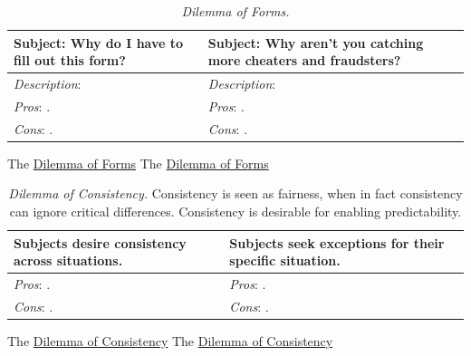 \begin{center}
\begin{table}[H] %
\begin{tabular}{ | m{\dilemmatablewidth}| m{\dilemmatablewidth} | } 
  \hline
  \textbf{Subject: Why do I have to fill out this form?} &
  \textbf{Subject: Why aren't you catching more cheaters and fraudsters?} \\
  \hline
  \textit{Description}:  & 
  \textit{Description}:  \\
  \hline
  \textit{Pros}: . & 
  \textit{Pros}: . \\
  \hline
  \textit{Cons}: . & 
  \textit{Cons}: . \\
  \hline
\end{tabular}
\caption{\textit{Dilemma of Forms.}
}
\label{table:dilemma-forms}
\end{table}
\end{center}


The \href{table:dilemma-forms}{Dilemma of Forms}
The \href{table:dilemma-forms}{Dilemma of Forms}


\begin{center}
\begin{table}[H] %
\begin{tabular}{ | m{\dilemmatablewidth}| m{\dilemmatablewidth} | } 
  \hline
  \textbf{Subjects desire consistency across situations.} &
  \textbf{Subjects seek exceptions for their specific situation.} \\
  \hline
  \textit{Pros}: . & 
  \textit{Pros}: . \\
  \hline
  \textit{Cons}: . & 
  \textit{Cons}: . \\
  \hline
\end{tabular}
\caption{\textit{Dilemma of Consistency.}
Consistency is seen as fairness, when in fact consistency can ignore critical differences. Consistency is desirable for enabling predictability.
}
\label{table:dilemma-consistency}
\end{table}
\end{center}


The \href{table:dilemma-consistency}{Dilemma of Consistency}
The \href{table:dilemma-consistency}{Dilemma of Consistency}


